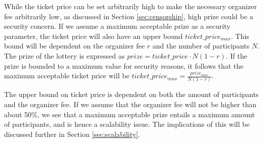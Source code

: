 While the ticket price can be set arbitrarily high to make the necessary organizer fee arbitrarily low, as discussed in Section \ref{sec:censorship}, high prize could be a security concern. If we assume a maximum acceptable prize as a security parameter, the ticket price will also have an upper bound $ticket\_price_{max}$. This bound will be dependent on the organizer fee $r$ and the number of participants $N$. The prize of the lottery is expressed as $prize=ticket\_price \cdot N(1-r)$. If the prize is bounded to a maximum value for security reasons, it follows that the maximum acceptable ticket price will be $ticket\_price_{max}=\frac{prize_{max}}{N(1-r)}$. 

The upper bound on ticket price is dependent on both the amount of participants and the organizer fee. If we assume that the organizer fee will not be higher than about 50\%, we see that a maximum acceptable prize entails a maximum amount of participants, and is hence a scalability issue. The implications of this will be discussed further in Section \ref{sec:scalability}.
